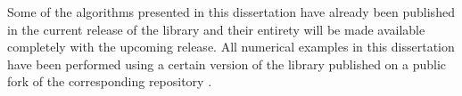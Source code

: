 Some of the algorithms presented in this dissertation have already been published in the current release of the \dealii{} library \parencite{arndt2019} and their entirety will be made available completely with the upcoming release. All numerical examples in this dissertation have been performed using a certain version of the library published on a public fork \textcite{finaldissertation} of the corresponding \dealii{} repository \textcite{dealii920}.
